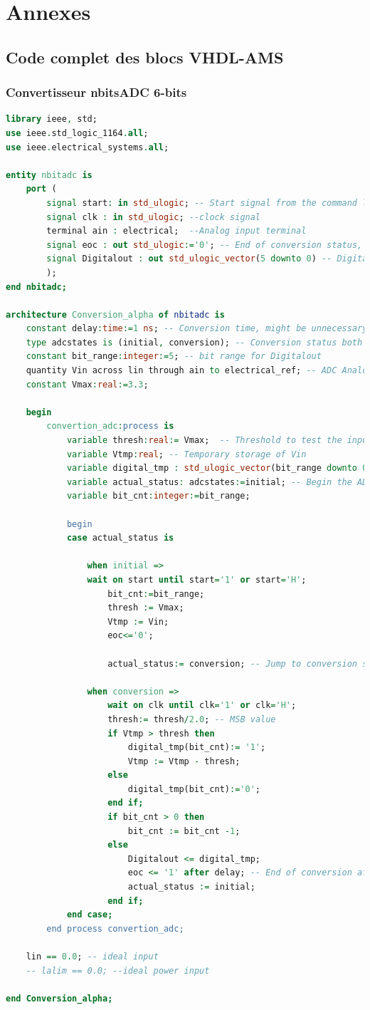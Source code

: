 \documentclass[a4paper]{article}
\begin{document}
\clearpage
\section{Annexes}

\subsection{Code complet des blocs VHDL-AMS}

\subsubsection{Convertisseur nbitsADC 6-bits }

\begin{lstlisting}[language=VHDL, belowskip=-0.5 \baselineskip]
library ieee, std;
use ieee.std_logic_1164.all;
use ieee.electrical_systems.all;

entity nbitadc is
	port (
		signal start: in std_ulogic; -- Start signal from the command logic
		signal clk : in std_ulogic; --clock signal
		terminal ain : electrical;  --Analog input terminal
		signal eoc : out std_ulogic:='0'; -- End of conversion status, initialized on default and used by the command logic
		signal Digitalout : out std_ulogic_vector(5 downto 0) -- Digital 6 bits output
		);
end nbitadc;

architecture Conversion_alpha of nbitadc is
	constant delay:time:=1 ns; -- Conversion time, might be unnecessary
	type adcstates is (initial, conversion); -- Conversion status both initial and on time
	constant bit_range:integer:=5; -- bit range for Digitalout
	quantity Vin across lin through ain to electrical_ref; -- ADC Analog input
	constant Vmax:real:=3.3;

	begin
		convertion_adc:process is
			variable thresh:real:= Vmax;  -- Threshold to test the input voltage against
			variable Vtmp:real; -- Temporary storage of Vin
			variable digital_tmp : std_ulogic_vector(bit_range downto 0); -- Temporary digital output data
			variable actual_status: adcstates:=initial; -- Begin the ADC states with the initial state
			variable bit_cnt:integer:=bit_range;

			begin
			case actual_status is

				when initial =>
				wait on start until start='1' or start='H';
					bit_cnt:=bit_range;
					thresh := Vmax;
					Vtmp := Vin;
					eoc<='0';

					actual_status:= conversion; -- Jump to conversion state

				when conversion =>
					wait on clk until clk='1' or clk='H';
					thresh:= thresh/2.0; -- MSB value
					if Vtmp > thresh then
						digital_tmp(bit_cnt):= '1';
						Vtmp := Vtmp - thresh;
					else
						digital_tmp(bit_cnt):='0';
					end if;
					if bit_cnt > 0 then
						bit_cnt := bit_cnt -1;
					else
						Digitalout <= digital_tmp;
						eoc <= '1' after delay; -- End of conversion after a delay
						actual_status := initial;
					end if;
			end case;
		end process convertion_adc;

	lin == 0.0; -- ideal input
	-- lalim == 0.0; --ideal power input

end Conversion_alpha;
\end{lstlisting}
\end{document}

